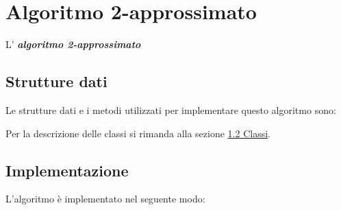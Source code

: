 \section{Algoritmo 2-approssimato}
\label{AlgoritmoApprossimato}

L' \textbf{\textit{algoritmo 2-approssimato}} 

\subsection{Strutture dati}
\label{struttureDati3}

Le strutture dati e i metodi utilizzati per implementare questo algoritmo sono:


Per la descrizione delle classi si rimanda alla sezione \hyperlink{section.2}{1.2 Classi}.
\newline


\subsection{Implementazione}
\label{implementazione3}

L'algoritmo è implementato nel seguente modo:

